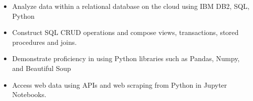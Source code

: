 \documentclass[11pt,a4paper,ragged2e]{altacv}
\begin{document}
\begin{paracol}{1}
\begin{itemize}
\item Analyze data within a relational database on the cloud using IBM DB2, SQL, Python
\item Construct SQL CRUD operations and compose views, transactions, stored procedures and joins.
\end{itemize}
\tightdivider

\begin{itemize}
\item Demonstrate proficiency in using Python libraries such as Pandas, Numpy, and Beautiful Soup
\item Access web data using APIs and web scraping from Python in Jupyter Notebooks.
\end{itemize}
\tightdivider

\medskip





\end{paracol}
\end{document}
